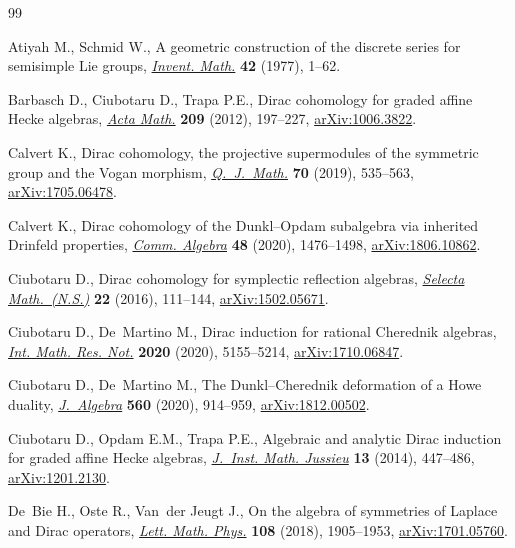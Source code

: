 \begin{thebibliography}{99}
\footnotesize\itemsep=0pt

Atiyah M., Schmid W., A geometric construction of the discrete series for
 semisimple {L}ie groups, \href{https://doi.org/10.1007/BF01389783}{\textit{Invent. Math.}} \textbf{42} (1977), 1--62.

Barbasch D., Ciubotaru D., Trapa P.E., Dirac cohomology for graded affine
 {H}ecke algebras, \href{https://doi.org/10.1007/s11511-012-0085-3}{\textit{Acta Math.}} \textbf{209} (2012), 197--227,
 \href{https://arxiv.org/abs/1006.3822}{arXiv:1006.3822}.

Calvert K., Dirac cohomology, the projective supermodules of the symmetric
 group and the {V}ogan morphism, \href{https://doi.org/10.1093/qmath/hay057}{\textit{Q.~J.~Math.}} \textbf{70} (2019),
 535--563, \href{https://arxiv.org/abs/1705.06478}{arXiv:1705.06478}.

Calvert K., Dirac cohomology of the {D}unkl--{O}pdam subalgebra via inherited
 {D}rinfeld properties, \href{https://doi.org/10.1080/00927872.2019.1691567}{\textit{Comm. Algebra}} \textbf{48} (2020), 1476--1498,
 \href{https://arxiv.org/abs/1806.10862}{arXiv:1806.10862}.

Ciubotaru D., Dirac cohomology for symplectic reflection algebras,
 \href{https://doi.org/10.1007/s00029-015-0189-7}{\textit{Selecta Math.~(N.S.)}} \textbf{22} (2016), 111--144,
 \href{https://arxiv.org/abs/1502.05671}{arXiv:1502.05671}.

Ciubotaru D., De~Martino M., Dirac induction for rational {C}herednik algebras,
 \href{https://doi.org/10.1093/imrn/rny153}{\textit{Int. Math. Res. Not.}} \textbf{2020} (2020), 5155--5214,
 \href{https://arxiv.org/abs/1710.06847}{arXiv:1710.06847}.

Ciubotaru D., De~Martino M., The {D}unkl--{C}herednik deformation of a {H}owe
 duality, \href{https://doi.org/10.1016/j.jalgebra.2020.05.034}{\textit{J.~Algebra}} \textbf{560} (2020), 914--959,
 \href{https://arxiv.org/abs/1812.00502}{arXiv:1812.00502}.

Ciubotaru D., Opdam E.M., Trapa P.E., Algebraic and analytic {D}irac induction
 for graded affine {H}ecke algebras, \href{https://doi.org/10.1017/S147474801300008X}{\textit{J.~Inst. Math. Jussieu}}
 \textbf{13} (2014), 447--486, \href{https://arxiv.org/abs/1201.2130}{arXiv:1201.2130}.

De~Bie H., Oste R., Van~der Jeugt J., On the algebra of symmetries of {L}aplace
 and {D}irac operators, \href{https://doi.org/10.1007/s11005-018-1065-0}{\textit{Lett. Math. Phys.}} \textbf{108} (2018),
 1905--1953, \href{https://arxiv.org/abs/1701.05760}{arXiv:1701.05760}.


\end{thebibliography}
